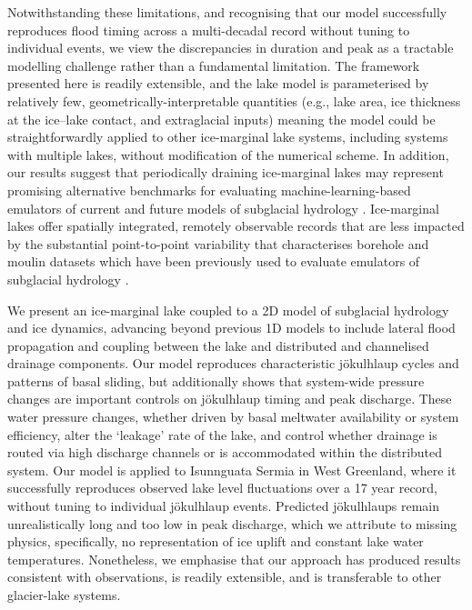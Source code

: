 \documentclass[tc, manuscript]{copernicus}
\begin{document}
Notwithstanding these limitations, and recognising that our model successfully reproduces flood timing across a multi-decadal record without tuning to individual events, we view the discrepancies in duration and peak as a tractable modelling challenge rather than a fundamental limitation. The framework presented here is readily extensible, and the lake model is parameterised by relatively few, geometrically-interpretable quantities (e.g., lake area, ice thickness at the ice--lake contact, and extraglacial inputs) meaning the model could be straightforwardly applied to other ice-marginal lake systems, including systems with multiple lakes, without modification of the numerical scheme. In addition, our results suggest that periodically draining ice-marginal lakes may represent promising alternative benchmarks for evaluating machine-learning-based emulators of current and future models of subglacial hydrology \citep[e.g.,][]{brinkerhoff2021constraining,verjans2024accelerating,hill2025computationally}. Ice-marginal lakes offer spatially integrated, remotely observable records \citep{domgaard2024altimetry,livingstone2025ice} that are less impacted by the substantial point-to-point variability that characterises borehole and moulin datasets \citep{murray1995black,rada2018channelized,ing2026connectivity} which have been previously used to evaluate emulators of subglacial hydrology \citep[e.g.,][]{hill2025emulator}.

\conclusions

We present an ice-marginal lake coupled to a 2D model of subglacial hydrology and ice dynamics, advancing beyond previous 1D models to include lateral flood propagation and coupling between the lake and distributed and channelised drainage components. Our model reproduces characteristic jökulhlaup cycles and patterns of basal sliding, but additionally shows that system-wide pressure changes are important controls on jökulhlaup timing and peak discharge. These water pressure changes, whether driven by basal meltwater availability or system efficiency, alter the `leakage' rate of the lake, and control whether drainage is routed via high discharge channels or is accommodated within the distributed system. Our model is applied to Isunnguata Sermia in West Greenland, where it successfully reproduces observed lake level fluctuations over a 17 year record, without tuning to individual jökulhlaup events. Predicted jökulhlaups remain unrealistically long and too low in peak discharge, which we attribute to missing physics, specifically, no representation of ice uplift and constant lake water temperatures. Nonetheless, we emphasise that our approach has produced results consistent with observations, is readily extensible, and is transferable to other glacier-lake systems.
\end{document}
